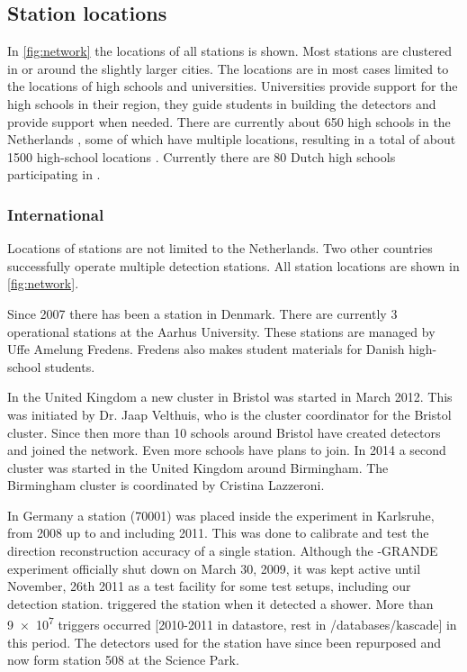 \subsection{Station locations}

In \cref{fig:network} the locations of all \hisparc stations is shown. Most stations are clustered in or around the slightly larger cities. The locations are in most cases limited to the locations of high schools and universities. Universities provide support for the high schools in their region, they guide students in building the detectors and provide support when needed. There are currently about \num{650} high schools in the Netherlands  \cite{duo2016hoofd}, some of which have multiple locations, resulting in a total of about \num{1500} high-school locations \cite{duo2016all}. Currently there are \num{80} Dutch high schools participating in \hisparc.


\subsubsection{International}

Locations of \hisparc stations are not limited to the Netherlands. Two other countries successfully operate multiple detection stations. All station locations are shown in \cref{fig:network}.

Since 2007 there has been a \hisparc station in Denmark. There are currently 3 operational stations at the Aarhus University. These stations are managed by Uffe Amelung Fredens. Fredens also makes student materials for Danish high-school students.

In the United Kingdom a new cluster in Bristol was started in March 2012. This was initiated by Dr. Jaap Velthuis, who is the cluster coordinator for the Bristol cluster. Since then more than 10 schools around Bristol have created detectors and joined the network. Even more schools have plans to join. In 2014 a second cluster was started in the United Kingdom around Birmingham. The Birmingham cluster is coordinated by Cristina Lazzeroni.

In Germany a station (70001) was placed inside the \kascade experiment in Karlsruhe, from 2008 up to and including 2011. This was done to calibrate and test the direction reconstruction accuracy of a single \hisparc station. Although the \kascade-GRANDE experiment officially shut down on March 30, 2009, it was kept active until November, 26th 2011 as a test facility for some test setups, including our detection station. \kascade triggered the \hisparc station when it detected a shower. More than \num{9e7} triggers occurred [2010-2011 in datastore, rest in /databases/kascade] in this period. The detectors used for the \kascade station have since been repurposed and now form station 508 at the Science Park.

